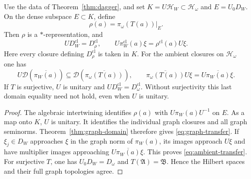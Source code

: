 \begin{proposition}
Use\label{prop:graph-transfer} the data of Theorem~\ref{thm:dagger}, and set
$K=U\mathcal H_W\subset\mathcal H_\omega$ and $E=U_0D_W$.
On the dense subspace $E\subset K$, define
\[
 \rho(a)=\pi_\omega(T(a))|_E.
\]
Then $\rho$ is a $*$-representation, and
\begin{equation}
 U D_W^{\mathrm{cl}}=D_\rho^{\mathrm{cl}},
 \qquad
 U\pi_W^{\mathrm{cl}}(a)\xi=\rho^{\mathrm{cl}}(a)U\xi.
 \label{eq:graph-transfer}
\end{equation}
Here every closure defining $D_\rho^{\mathrm{cl}}$ is taken in $K$.
For the ambient closures on $\mathcal H_\omega$ one has
\begin{equation}
 U\mathcal D(\overline{\pi_W(a)})
 \subseteq\mathcal D(\overline{\pi_\omega(T(a))}),
 \qquad
 \overline{\pi_\omega(T(a))}U\xi
 =U\overline{\pi_W(a)}\xi.
 \label{eq:ambient-transfer}
\end{equation}
If $T$ is surjective, $U$ is unitary and
$U D_W^{\mathrm{cl}}=D_\omega^{\mathrm{cl}}$.
Without surjectivity this last domain equality need not hold,
even when $U$ is unitary.
\end{proposition}

\begin{proof}
The algebraic intertwining identifies $\rho(a)$ with
$U\pi_W(a)U^{-1}$ on $E$.  As a map onto $K$, $U$ is unitary.
It identifies the individual graph closures and all graph seminorms.
Theorem~\ref{thm:graph-domain} therefore gives \eqref{eq:graph-transfer}.
If $\xi_j\in D_W$ approaches $\xi$ in the graph norm of
$\pi_W(a)$, its images approach $U\xi$ and have multiplier images
approaching $U\overline{\pi_W(a)}\xi$.
This proves \eqref{eq:ambient-transfer}.
For surjective $T$, one has $U_0D_W=D_\omega$ and $T(\mathfrak A)=\mathfrak B$.
Hence the Hilbert spaces and their full graph topologies agree.
\end{proof}

